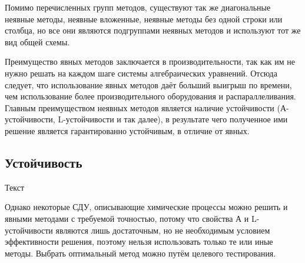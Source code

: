 Помимо перечисленных групп методов, существуют так же диагональные неявные методы, неявные вложенные, неявные методы без одной строки
или столбца, но все они являются подгруппами неявных методов и используют тот же вид общей схемы.

Преимущество явных методов заключается в производительности, так как им не нужно решать на каждом шаге системы алгебраических
уравнений. Отсюда следует, что использование явных методов даёт больший выигрыш по времени, чем использование более производительного
оборудования и распараллеливания. Главным преимуществом неявных методов является наличие устойчивости (А-устойчивости, L-устойчивости и
так далее), в результате чего полученное ими решение является гарантированно устойчивым, в отличие от явных.

\subsection{Устойчивость}

Текст

Однако некоторые СДУ, описывающие химические процессы можно решить и явными методами с требуемой точностью, потому что свойства А и
L-устойчивости являются
лишь достаточным, но не необходимым условием эффективности решения, поэтому нельзя использовать только те или иные методы. Выбрать
оптимальный метод можно путём целевого тестирования.


